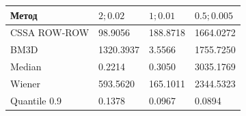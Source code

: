 \begin{tabular}{|l|l|l|l|}
\hline
Метод & $2; 0.02$ & $1; 0.01$ & $0.5; 0.005$ \\
\hline
CSSA ROW-ROW & 98.9056 & 188.8718 & 1664.0272 \\
\hline
BM3D & 1320.3937 & 3.5566 & 1755.7250 \\
\hline
Median & 0.2214 & 0.3050 & 3035.1769 \\
\hline
Wiener & 593.5620 & 165.1011 & 2344.5323 \\
\hline
Quantile 0.9 & 0.1378 & 0.0967 & 0.0894 \\
\hline
\end{tabular}
